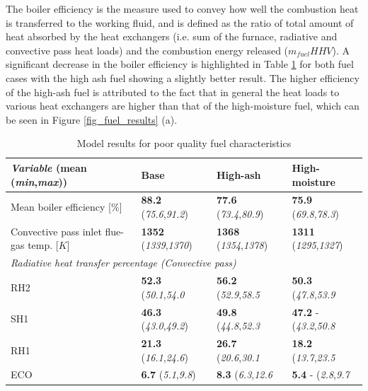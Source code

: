 \documentclass[a4paper,fleqn]{cas-sc}
\begin{document}
The boiler efficiency is the measure used to convey how well the combustion heat is transferred to the working fluid, and is defined as the ratio of total amount of heat absorbed by the heat exchangers (i.e. sum of the furnace, radiative and convective pass heat loads) and the combustion energy released ($m_{fuel}HHV$). A significant decrease in the boiler efficiency is highlighted in Table \ref{tbl_fuel_results} for both fuel cases with the high ash fuel showing a slightly better result. The higher efficiency of the high-ash fuel is attributed to the fact that in general the heat loads to various heat exchangers are higher than that of the high-moisture fuel, which can be seen in Figure \ref{fig_fuel_results} (a). 

\begin{table}[h!]
\caption{Model results for poor quality fuel characteristics}\label{tbl_fuel_results}
\begin{tabular*}{\tblwidth}{p{}p{}p{}p{}}
\toprule
\textit{Variable} (\textbf{mean}  (\textit{min},\textit{max}))& Base & High-ash & High-moisture \\ %
\midrule
Mean boiler efficiency [\%]& \textbf{88.2}  (\textit{75.6},\textit{91.2}) & \textbf{77.6}  (\textit{73.4},\textit{80.9}) & \textbf{75.9}  (\textit{69.8},\textit{78.3})\\
Convective pass inlet flue-gas temp. [$K$]& \textbf{1352}  (\textit{1339},\textit{1370}) & \textbf{1368}  (\textit{1354},\textit{1378}) & \textbf{1311}  (\textit{1295},\textit{1327})\\
\midrule
\multicolumn{4}{l}{\textit{Radiative heat transfer percentage (Convective pass)} }\\
\midrule
RH2 & \textbf{52.3}  (\textit{50.1},\textit{54.0}& \textbf{56.2}  (\textit{52.9},\textit{58.5} & \textbf{50.3}  (\textit{47.8},\textit{53.9}\\
SH1 & \textbf{46.3}  (\textit{43.0},\textit{49.2})& \textbf{49.8}  (\textit{44.8},\textit{52.3}& \textbf{47.2} - (\textit{43.2},\textit{50.8}\\
RH1 & \textbf{21.3}  (\textit{16.1},\textit{24.6})& \textbf{26.7}  (\textit{20.6},\textit{30.1}& \textbf{18.2}  (\textit{13.7},\textit{23.5}\\
ECO & \textbf{6.7}  (\textit{5.1},\textit{9.8})& \textbf{8.3}  (\textit{6.3},\textit{12.6}& \textbf{5.4} - (\textit{2.8},\textit{9.7}\\
\bottomrule
\end{tabular*}
\end{table}  
\end{document}

